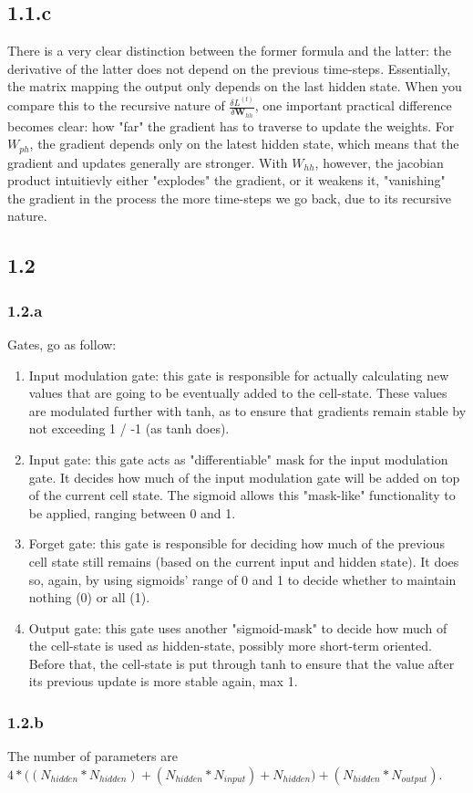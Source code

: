 \subsection*{1.1.c}
There is a very clear distinction between the former formula and the latter: the derivative of the latter
does not depend on the previous time-steps. Essentially, the matrix mapping the output only depends on the last
hidden state. When you compare this to the recursive nature of $\frac{\delta L^{(t)}}{\delta \textbf{W}_{hh}}$, 
one important practical difference becomes clear: how "far" the gradient has to traverse to update the weights. For
$W_{ph}$, the gradient depends only on the latest hidden state, which means that the gradient and updates
generally are stronger. With $W_{hh}$, however, the jacobian product intuitievly either "explodes" the
gradient, or it weakens it, "vanishing" the gradient in the process the more time-steps we go back, due to 
its recursive nature.

\subsection*{1.2}
\subsubsection*{1.2.a}
Gates, go as follow:

\begin{enumerate}
    \item Input modulation gate: this gate is responsible for actually calculating new values that 
    are going to be eventually added to the cell-state. These values are modulated further with tanh,
    as to ensure that gradients remain stable by not exceeding 1 / -1 (as tanh does).
    \item Input gate: this gate acts as "differentiable" mask for the input modulation gate.
    It decides how much of the input modulation gate will be added on top of the current cell state.
    The sigmoid allows this "mask-like" functionality to be applied, ranging between 0 and 1.
    \item Forget gate: this gate is responsible for deciding how much of the previous cell state
    still remains (based on the current input and hidden state). It does so, again, by using
    sigmoids' range of 0 and 1 to decide whether to maintain nothing (0) or all (1).
    \item Output gate: this gate uses another "sigmoid-mask" to decide how much of the cell-state
    is used as hidden-state, possibly more short-term oriented. Before that, the cell-state
    is put through tanh to ensure that the value after its previous update is more stable again, max 1.
\end{enumerate}

\subsubsection*{1.2.b}
The number of parameters are $4 * \Big((N_{hidden} * N_{hidden}) + (N_{hidden} * N_{input}) 
+ N_{hidden}\Big) + (N_{hidden} * N_{output}) $.

